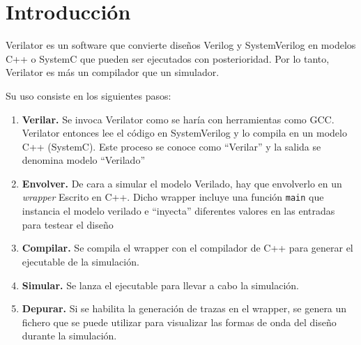 \chapter{Introducción}\label{cap:introduccion}
Verilator es un software que convierte diseños Verilog y SystemVerilog en modelos C++ o SystemC que pueden ser ejecutados con posterioridad. Por lo tanto, Verilator es más un compilador que un simulador.

Su uso consiste en los siguientes pasos:
\begin{enumerate}
    \item \textbf{Verilar.} Se invoca Verilator como se haría con herramientas como GCC. Verilator entonces lee el código en SystemVerilog y lo compila en un modelo C++ (SystemC). Este proceso se conoce como ``Verilar'' y la salida se denomina modelo ``Verilado''
    \item \textbf{Envolver.} De cara a simular el modelo Verilado, hay que envolverlo en un \textit{wrapper} Escrito en C++. Dicho wrapper incluye una función \verb|main| que instancia el modelo verilado e ``inyecta'' diferentes valores en las entradas para testear el diseño
    \item \textbf{Compilar.} Se compila el wrapper con el compilador de C++ para generar el ejecutable de la simulación.
    \item \textbf{Simular.} Se lanza el ejecutable para llevar a cabo la simulación.
    \item \textbf{Depurar. } Si se habilita la generación de trazas en el wrapper, se genera un fichero que se puede utilizar para visualizar las formas de onda del diseño durante la simulación.
\end{enumerate}

